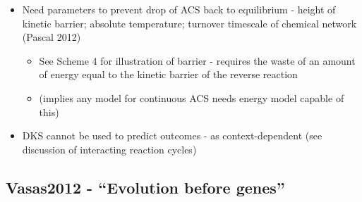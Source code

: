 \begin{itemize}
\begin{itemize}
				\item
				
				Need parameters to prevent drop of ACS back to equilibrium - height
				of kinetic barrier; absolute temperature; turnover timescale of
				chemical network (Pascal 2012)
				
				
				\begin{itemize}
					\item
					
					See Scheme 4 for illustration of barrier - requires the waste of
					an amount of energy equal to the kinetic barrier of the reverse
					reaction
					
					\item
					
					(implies any model for continuous ACS needs energy model capable
					of this)
					
				\end{itemize}
				\item
				
				DKS cannot be used to predict outcomes - as context-dependent (see
				discussion of interacting reaction cycles)
				
			\end{itemize}
		\end{itemize}
		
		\hypertarget{vasas2012---evolution-before-genes}{\subsection{Vasas2012 -
				``Evolution before genes''}\label{vasas2012---evolution-before-genes}}
		
